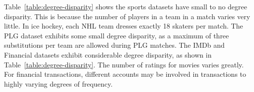 \documentclass[conference]{IEEEtran}
\begin{document}
\begin{table}[ht]
\caption{Feature Variance  vs. Average Feature Variance}
\centering
{}
\label{table:variances}
\end{table}


Table~\ref{table:degree-disparity} shows the sports datasets have small to no degree disparity. This is because the number of players in a team in a match varies very little. In ice hockey, each NHL team dresses exactly 18 skaters per match.
The PLG dataset exhibits some small degree disparity, as a maximum of three substitutions per team are allowed during PLG matches.  The IMDb and Financial datasets exhibit considerable degree disparity, as shown in Table~\ref{table:degree-disparity}. The number of ratings for movies varies greatly. For financial transactions, different accounts may be involved in transactions to highly varying degrees of frequency.
\end{document}
